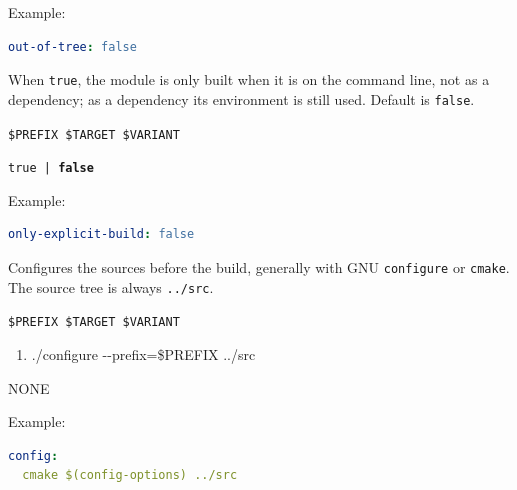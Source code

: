 \documentclass[a4paper,12pt,twoside]{article}
\newcommand{\code}[1]{\texttt{#1}}
\newcommand{\ddash}{-{}-}
\begin{document}
\begin{description}[font=\large\texttt]
	Example:
	\begin{lstlisting}[language={yaml}]
out-of-tree: false
\end{lstlisting}

	\item[only-explicit-build {[}<variant>{]}] When \code{true}, the module is only built when it is on the command line, not as a dependency; as a dependency its environment is still used. Default is \code{false}.
	\begin{description}[font=\textit,style=standard]
		\item[parameter] \tabto{2cm} \code{\$PREFIX \$TARGET \$VARIANT}
		\item[return] \tabto{2cm} \code{true | \textbf{false}}
	\end{description}

	Example:
	\begin{lstlisting}[language={yaml}]
only-explicit-build: false
\end{lstlisting}

	\item[config {[}<variant>{]}] Configures the sources before the build, generally with GNU \code{configure} or \code{cmake}. The source tree is always \code{../src}.
	\begin{description}[font=\textit,style=standard]
		\item[parameter] \tabto{2cm} \code{\$PREFIX \$TARGET \$VARIANT}
		\begin{enumerate}
			\item ./configure \ddash{}prefix=\$PREFIX ../src
		\end{enumerate}
		\item[return] \tabto{2cm} NONE
	\end{description}
	Example:
\begin{lstlisting}[language={yaml}]
config:
  cmake $(config-options) ../src
\end{lstlisting}


\end{description}
\end{document}
